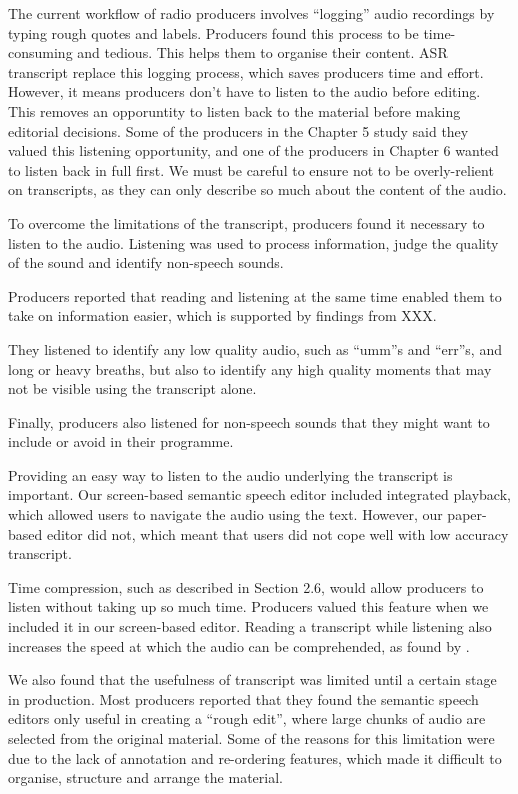 The current workflow of radio producers involves ``logging'' audio recordings by typing rough quotes and labels.
Producers found this process to be time-consuming and tedious. This helps them to organise their content. ASR
transcript replace this logging process, which saves producers time and effort. However, it means producers don't have
to listen to the audio before editing. This removes an opporuntity to listen back to the material before making
editorial decisions. Some of the producers in the Chapter 5 study said they valued this listening opportunity, and one
of the producers in Chapter 6 wanted to listen back in full first. We must be careful to ensure not to be
overly-relient on transcripts, as they can only describe so much about the content of the audio.

To overcome the limitations of the transcript, producers found it necessary to listen to the audio. Listening was used
to process information, judge the quality of the sound and identify non-speech sounds.

Producers reported that reading and listening at the same time enabled them to take on information easier, which is
supported by findings from XXX.

They listened to identify any low quality audio, such as ``umm''s and ``err''s, and long or heavy breaths, but also to
identify any high quality moments that may not be visible using the transcript alone.

Finally, producers also listened for non-speech sounds that they might want to include or avoid in their programme.

Providing an easy way to listen to the audio underlying the transcript is important. Our screen-based semantic speech
editor included integrated playback, which allowed users to navigate the audio using the text. However, our paper-based
editor did not, which meant that users did not cope well with low accuracy transcript.

Time compression, such as described in Section 2.6, would allow producers to listen without taking up so much time.
Producers valued this feature when we included it in our screen-based editor. Reading a transcript while listening also
increases the speed at which the audio can be comprehended, as found by \citet{Vemuri2004}.

We also found that the usefulness of transcript was limited until a certain stage in production. Most producers
reported that they found the semantic speech editors only useful in creating a ``rough edit'', where large chunks of
audio are selected from the original material. Some of the reasons for this limitation were due to the lack of
annotation and re-ordering features, which made it difficult to organise, structure and arrange the material.

